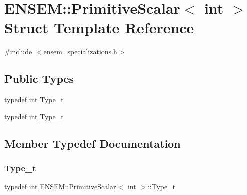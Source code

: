 \hypertarget{structENSEM_1_1PrimitiveScalar_3_01int_01_4}{}\section{E\+N\+S\+EM\+:\+:Primitive\+Scalar$<$ int $>$ Struct Template Reference}
\label{structENSEM_1_1PrimitiveScalar_3_01int_01_4}


{\ttfamily \#include $<$ensem\+\_\+specializations.\+h$>$}

\subsection*{Public Types}
\begin{DoxyCompactItemize}
\item 
typedef int \mbox{\hyperlink{structENSEM_1_1PrimitiveScalar_3_01int_01_4_add9ad08e498afda6942432a1df83407b}{Type\+\_\+t}}
\item 
typedef int \mbox{\hyperlink{structENSEM_1_1PrimitiveScalar_3_01int_01_4_add9ad08e498afda6942432a1df83407b}{Type\+\_\+t}}
\end{DoxyCompactItemize}


\subsection{Member Typedef Documentation}
\mbox{\label{structENSEM_1_1PrimitiveScalar_3_01int_01_4_add9ad08e498afda6942432a1df83407b}} 
\subsubsection{\texorpdfstring{Type\_t}{Type\_t}\hspace{0.1cm}{\footnotesize\ttfamily [1/2]}}
{\footnotesize\ttfamily typedef int \mbox{\hyperlink{structENSEM_1_1PrimitiveScalar}{E\+N\+S\+E\+M\+::\+Primitive\+Scalar}}$<$ int $>$\+::\mbox{\hyperlink{structENSEM_1_1PrimitiveScalar_3_01int_01_4_add9ad08e498afda6942432a1df83407b}{Type\+\_\+t}}}

\mbox{\label{structENSEM_1_1PrimitiveScalar_3_01int_01_4_add9ad08e498afda6942432a1df83407b}} 

